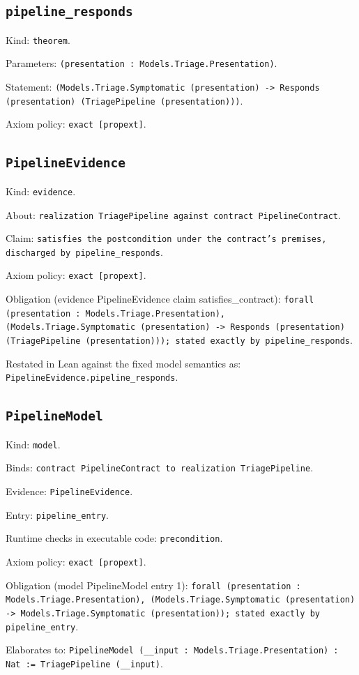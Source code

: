 \documentclass[11pt]{article}
\begin{document}
\subsection*{\texttt{pipeline\_responds}}
\noindent Kind: \texttt{theorem}.\par
\noindent Parameters: \texttt{(presentation : Models.Triage.Presentation)}.\par
\noindent Statement: \texttt{(Models.Triage.Symptomatic (presentation) -> Responds (presentation) (TriagePipeline (presentation)))}.\par
\noindent Axiom policy: \texttt{exact [propext]}.\par
\subsection*{\texttt{PipelineEvidence}}
\noindent Kind: \texttt{evidence}.\par
\noindent About: \texttt{realization TriagePipeline against contract PipelineContract}.\par
\noindent Claim: \texttt{satisfies the postcondition under the contract's premises, discharged by pipeline\_responds}.\par
\noindent Axiom policy: \texttt{exact [propext]}.\par
\noindent Obligation (evidence PipelineEvidence claim satisfies\_contract): \texttt{forall (presentation : Models.Triage.Presentation), (Models.Triage.Symptomatic (presentation) -> Responds (presentation) (TriagePipeline (presentation))); stated exactly by pipeline\_responds}.\par
\noindent Restated in Lean against the fixed model semantics as: \texttt{PipelineEvidence.pipeline\_responds}.\par
\subsection*{\texttt{PipelineModel}}
\noindent Kind: \texttt{model}.\par
\noindent Binds: \texttt{contract PipelineContract to realization TriagePipeline}.\par
\noindent Evidence: \texttt{PipelineEvidence}.\par
\noindent Entry: \texttt{pipeline\_entry}.\par
\noindent Runtime checks in executable code: \texttt{precondition}.\par
\noindent Axiom policy: \texttt{exact [propext]}.\par
\noindent Obligation (model PipelineModel entry 1): \texttt{forall (presentation : Models.Triage.Presentation), (Models.Triage.Symptomatic (presentation) -> Models.Triage.Symptomatic (presentation)); stated exactly by pipeline\_entry}.\par
\noindent Elaborates to: \texttt{PipelineModel (\_\_input : Models.Triage.Presentation) : Nat := TriagePipeline (\_\_input)}.\par
\end{document}
